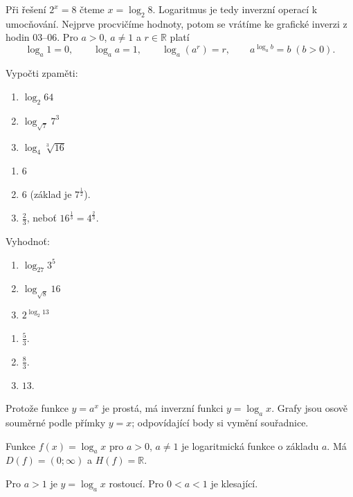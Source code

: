 \documentclass[11pt,a4paper]{article}
\begin{document}
Při řešení $2^x=8$ čteme $x=\log_2 8$. Logaritmus je tedy inverzní operací k umocňování. Nejprve procvičíme hodnoty, potom se vrátíme ke grafické inverzi z hodin 03--06.
Pro $a>0$, $a\ne1$ a $r\in\mathbb R$ platí
\[
\log_a1=0,\qquad \log_a a=1,\qquad \log_a(a^r)=r,
\qquad a^{\log_a b}=b\;(b>0).
\]
\begin{prikladReseniBox}[title={Příklad 1}]
Vypočti zpaměti:
\begin{enumerate}[label=\alph*)]
\item $\log_2 64$
\item $\log_{\sqrt7}7^3$
\item $\log_4\sqrt[3]{16}$
\end{enumerate}
\tcblower
\begin{enumerate}[label=\alph*)]
\item $6$
\item $6$ (základ je $7^{\frac12}$).
\item $\frac23$, neboť $16^{\frac13}=4^{\frac23}$.
\end{enumerate}
\end{prikladReseniBox}
\begin{prikladReseniBox}[title={Příklad 2}]
Vyhodnoť:
\begin{enumerate}[label=\alph*)]
\item $\log_{27}3^5$
\item $\log_{\sqrt8}16$
\item $2^{\log_2 13}$
\end{enumerate}
\tcblower
\begin{enumerate}[label=\alph*)]
\item $\frac53$.
\item $\frac83$.
\item $13$.
\end{enumerate}
\end{prikladReseniBox}
Protože funkce $y=a^x$ je prostá, má inverzní funkci $y=\log_a x$. Grafy jsou osově souměrné podle přímky $y=x$; odpovídající body si vymění souřadnice.
\begin{definiceBox}[title={Definice -- logaritmická funkce}]
Funkce $f(x)=\log_a x$ pro $a>0$, $a\ne1$ je logaritmická funkce o základu $a$. Má $D(f)=(0;\infty)$ a $H(f)=\mathbb R$.
\end{definiceBox}
Pro $a>1$ je $y=\log_a x$ rostoucí. Pro $0<a<1$ je klesající.
\end{document}
